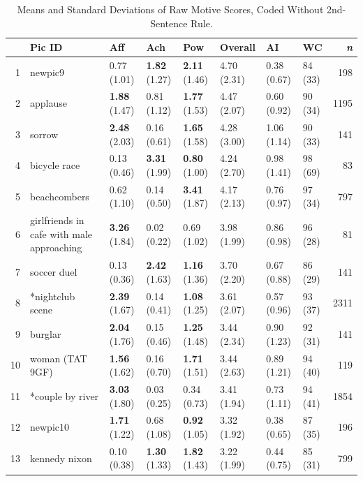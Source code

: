 \documentclass[jou,a4paper]{apa6}\usepackage[]{graphicx}\usepackage[]{color}
\begin{document}
\begin{table}
	\begin{threeparttable}
		\caption{Means and Standard Deviations of Raw Motive Scores, Coded Without 2nd-Sentence Rule.}
		\label{tab:norms}
		\small
		\begin{tabularx}{\textwidth}{rlllllllr}
		\toprule
 & Pic ID & Aff & Ach & Pow & Overall & AI & WC & \emph{n} \\ 
  \hline
  1 & newpic9 & 0.77 (1.01) & \textbf{1.82} (1.27) & \textbf{2.11} (1.46) & 4.70 (2.31) & 0.38 (0.67) & 84 (33) & 198 \\ 
    2 & applause & \textbf{1.88} (1.47) & 0.81 (1.12) & \textbf{1.77} (1.53) & 4.47 (2.07) & 0.60 (0.92) & 90 (34) & 1195 \\ 
    3 & sorrow & \textbf{2.48} (2.03) & 0.16 (0.61) & \textbf{1.65} (1.58) & 4.28 (3.00) & 1.06 (1.14) & 90 (33) & 141 \\ 
    4 & bicycle race & 0.13 (0.46) & \textbf{3.31} (1.99) & \textbf{0.80} (1.00) & 4.24 (2.70) & 0.98 (1.41) & 98 (69) &  83 \\ 
    5 & beachcombers & 0.62 (1.10) & 0.14 (0.50) & \textbf{3.41} (1.87) & 4.17 (2.13) & 0.76 (0.97) & 97 (34) & 797 \\ 
    6 & girlfriends in cafe with male approaching & \textbf{3.26} (1.84) & 0.02 (0.22) & 0.69 (1.02) & 3.98 (1.99) & 0.86 (0.98) & 96 (28) &  81 \\ 
    7 & soccer duel & 0.13 (0.36) & \textbf{2.42} (1.63) & \textbf{1.16} (1.36) & 3.70 (2.20) & 0.67 (0.88) & 86 (29) & 141 \\ 
    8 & *nightclub scene & \textbf{2.39} (1.67) & 0.14 (0.41) & \textbf{1.08} (1.25) & 3.61 (2.07) & 0.57 (0.96) & 93 (37) & 2311 \\ 
    9 & burglar & \textbf{2.04} (1.76) & 0.15 (0.46) & \textbf{1.25} (1.48) & 3.44 (2.34) & 0.90 (1.23) & 92 (31) & 141 \\ 
   10 & woman (TAT 9GF) & \textbf{1.56} (1.62) & 0.16 (0.70) & \textbf{1.71} (1.51) & 3.44 (2.63) & 0.89 (1.21) & 94 (40) & 119 \\ 
   11 & *couple by river & \textbf{3.03} (1.80) & 0.03 (0.25) & 0.34 (0.73) & 3.41 (1.94) & 0.73 (1.11) & 94 (41) & 1854 \\ 
   12 & newpic10 & \textbf{1.71} (1.22) & 0.68 (1.08) & \textbf{0.92} (1.05) & 3.32 (1.92) & 0.38 (0.65) & 87 (35) & 196 \\ 
   13 & kennedy nixon & 0.10 (0.38) & \textbf{1.30} (1.33) & \textbf{1.82} (1.43) & 3.22 (1.99) & 0.44 (0.75) & 85 (31) & 799 \\ 

\end{tabularx}
\end{threeparttable}
\end{table}
\end{document}
